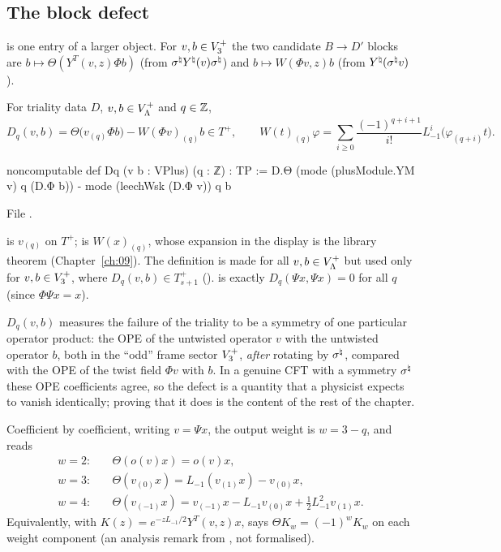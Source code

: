\subsection{The block defect}

 is one entry of a larger object.  For $v,b\in V_3^{+}$ the two candidate $B\to D'$ blocks
are $b\mapsto\Theta(Y^T(v,z)\Phi b)$ (from $\sigma^{\natural} Y^\natural(v)\sigma^{\natural}$) and
$b\mapsto W(\Phi v,z)b$ (from $Y^\natural(\sigma^{\natural} v)$).

\begin{definition}\label{ch14:def:Dq}
For triality data $D$, $v,b\in V_{\Lambda}^+$ and $q\in{\mathbb{Z}}$,
\begin{equation*}
  D_q(v,b)=\Theta\bigl(v_{(q)}\Phi b\bigr)-W(\Phi v)_{(q)}b\in T^+,
  \qquad
  W(t)_{(q)}\varphi=\sum_{i\ge0}\frac{(-1)^{q+i+1}}{i!}L_{-1}^i\bigl(\varphi_{(q+i)}t\bigr).
\end{equation*}
\end{definition}
\begin{leancode}
noncomputable def Dq (v b : VPlus) (q : ℤ) : TP :=
  D.Θ (mode (plusModule.YM v) q (D.Φ b)) - mode (leechWsk (D.Φ v)) q b
\end{leancode}
File .

\begin{dictionary}
 is $v_{(q)}$ on $T^+$;  is $W(x)_{(q)}$, whose
expansion in the display is the library theorem  (Chapter~\ref{ch:09}).  The
definition is made for all $v,b\in V_{\Lambda}^+$ but used only for $v,b\in V_3^{+}$, where
$D_q(v,b)\in T_{s+1}^+$ ().   is exactly $D_q(\Psi x,\Psi x)=0$ for all $q$
(since $\Phi\Psi x=x$).
\end{dictionary}

\begin{physics}
$D_q(v,b)$ measures the failure of the triality to be a symmetry of one particular operator product:
the OPE of the untwisted operator $v$ with the untwisted operator $b$, both in the ``odd'' frame
sector $V_3^{+}$, \emph{after} rotating by $\sigma^{\natural}$, compared with the OPE of the twist field
$\Phi v$ with $b$.  In a genuine CFT with a symmetry $\sigma^{\natural}$ these OPE coefficients agree, so
the defect is a quantity that a physicist expects to vanish identically; proving that it does is
the content of the rest of the chapter.
\end{physics}

Coefficient by coefficient, writing $v=\Psi x$, the output weight is $w=3-q$, and  reads
\begin{align*}
 w=2:&\quad \Theta(o(v)x)=o(v)x,\\
 w=3:&\quad \Theta(v_{(0)}x)=L_{-1}(v_{(1)}x)-v_{(0)}x,\\
 w=4:&\quad \Theta(v_{(-1)}x)=v_{(-1)}x-L_{-1}v_{(0)}x+\tfrac12L_{-1}^2v_{(1)}x .
\end{align*}
Equivalently, with $K(z)=e^{-zL_{-1}/2}Y^T(v,z)x$,  says $\Theta K_w=(-1)^wK_w$ on each weight
component (an analysis remark from , not formalised).

